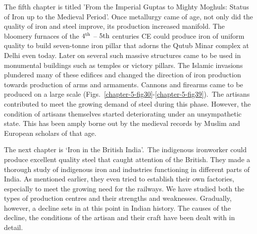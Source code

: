 The fifth chapter is titled 'From the Imperial Guptas to Mighty Moghuls: Status of Iron up to the Medieval Period'. Once metallurgy came of age, not only did the quality of iron and steel improve, its production increased manifold. The bloomery furnaces of the $4^{\rm th}$ – $5{\rm th}$ centuries CE could produce iron of uniform quality to build seven-tonne iron pillar that adorns the Qutub Minar complex at Delhi even today. Later on several such massive structures came to be used in monumental buildings such as temples or victory pillars. The Islamic invasions plundered many of these edifices and changed the direction of iron production towards production of arms and armaments. Cannons and firearms came to be produced on a large scale (Figs.~\ref{chapter-5-fig30}-\ref{chapter-5-fig39}).~The artisans contributed to meet the growing demand of steel during this phase. However, the condition of artisans themselves started deteriorating under an unsympathetic state. This has been amply borne out by the medieval records by Muslim and European scholars of that age.



The next chapter is `Iron in the British India'.~The indigenous ironworker could produce excellent quality steel that caught attention of the British. They made a thorough study of indigenous iron and industries functioning in different parts of India. As mentioned earlier, they even tried to establish their own factories, especially to meet the growing need for the railways. We have studied both the types of production centres and their strengths and weaknesses. Gradually, however, a decline sets in at this point in Indian history. The causes of the decline, the conditions of the artisan and their craft have been dealt with in detail.

